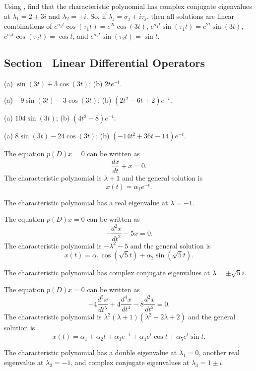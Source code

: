 \soln Using \Matlab, find that the characteristic polynomial has complex
conjugate eigenvalues at $\lambda_1 = 2 \pm 3i$ and $\lambda_2 = \pm i$.
So, if $\lambda_j = \sigma_j + i\tau_j$, then all solutions are linear
combinations of $e^{\sigma_1 t}\cos(\tau_1 t) = e^{2t}\cos(3t)$,
$e^{\sigma_1 t}\sin(\tau_1 t) = e^{2t}\sin(3t)$,
$e^{\sigma_2 t}\cos(\tau_2 t) = \cos t$, and
$e^{\sigma_2 t}\sin(\tau_2 t) = \sin t$.



\newpage
\subsection*{Section~\protect{\ref{S:LDO}} Linear Differential Operators}

 \ans (a) $\sin(3t)+3\cos(3t)$; (b) $2te^{-t}$.

 \ans (a) $-9\sin(3t)-3\cos(3t)$; (b) $(2t^2-6t+2)e^{-t}$.

 \ans (a) $104\sin(3t)$; (b) $(4t^2+8)e^{-t}$.

 \ans (a) $8\sin(3t)-24\cos(3t)$; (b) $(-14t^2+36t-14)e^{-t}$.


 \ans The equation $p(D)x = 0$ can be written as
\[
\frac{dx}{dt} + x = 0.
\]
The characteristic polynomial is
$\lambda + 1$
and the general solution is
\[
x(t) = \alpha_1e^{-t}.
\]

\soln The characteristic polynomial has a real eigenvalue at $\lambda = -1$.

 \ans The equation $p(D)x = 0$ can be written as
\[
-\frac{d^2x}{dt^2} - 5x = 0.
\]
The characteristic polynomial is
$-\lambda^2 - 5$
and the general solution is
\[
x(t) = \alpha_1\cos(\sqrt{5}t) + \alpha_2\sin(\sqrt{5}t).
\]

\soln The characteristic polynomial has complex conjugate eigenvalues
at $\lambda = \pm\sqrt{5}i$.


 \ans The equation $p(D)x = 0$ can be written as
\[
-4\frac{d^5x}{dt^5} + 4\frac{d^4x}{dt^4} - 8\frac{d^2x}{dt^2} = 0.
\]
The characteristic polynomial is
$\lambda^2(\lambda + 1)(\lambda^2 - 2\lambda + 2)$
and the general solution is
\[
x(t) = \alpha_1 + \alpha_2 t + \alpha_3e^{-t} +
\alpha_4e^t\cos t + \alpha_5e^t\sin t.
\]

\soln The characteristic polynomial has a double eigenvalue at
$\lambda_1 = 0$, another real eigenvalue at $\lambda_2 = -1$, and complex
conjugate eigenvalues at $\lambda_3 = 1 \pm i$.


